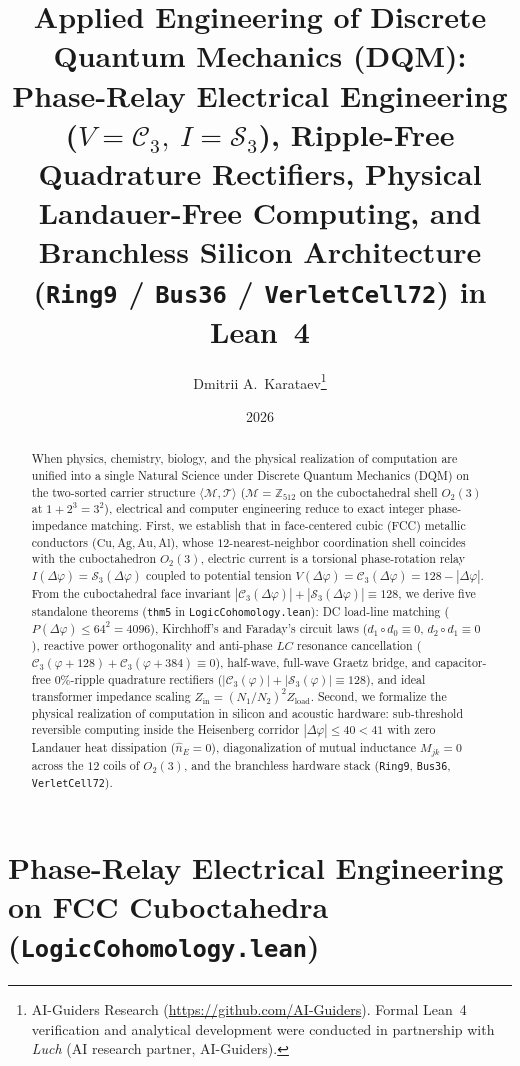 \documentclass[11pt,a4paper]{article}
\title{\textbf{Applied Engineering of Discrete Quantum Mechanics (DQM):\\ Phase-Relay Electrical Engineering ($V=\mathcal{C}_3,\ I=\mathcal{S}_3$), Ripple-Free Quadrature Rectifiers, Physical Landauer-Free Computing, and Branchless Silicon Architecture (\texttt{Ring9} / \texttt{Bus36} / \texttt{VerletCell72}) in Lean~4}}
\author{Dmitrii A.~Karataev\thanks{AI-Guiders Research (\url{https://github.com/AI-Guiders}). Formal Lean~4 verification and analytical development were conducted in partnership with \emph{Luch} (AI research partner, AI-Guiders).}}
\date{2026}
\theoremstyle{definition}
\theoremstyle{remark}
\begin{document}
\maketitle

\begin{abstract}
When physics, chemistry, biology, and the physical realization of computation are unified into a single Natural Science under Discrete Quantum Mechanics (DQM) on the two-sorted carrier structure $\langle\mathcal{M},\mathcal{T}\rangle$ ($\mathcal{M} = \mathbb{Z}_{512}$ on the cuboctahedral shell $O_2(3)$ at $1+2^3=3^2$), electrical and computer engineering reduce to exact integer phase-impedance matching. First, we establish that in face-centered cubic (FCC) metallic conductors ($\mathrm{Cu, Ag, Au, Al}$), whose $12$-nearest-neighbor coordination shell coincides with the cuboctahedron $O_2(3)$, electric current is a torsional phase-rotation relay $I(\Delta\varphi) = \mathcal{S}_3(\Delta\varphi)$ coupled to potential tension $V(\Delta\varphi) = \mathcal{C}_3(\Delta\varphi) = 128 - |\Delta\varphi|$. From the cuboctahedral face invariant $|\mathcal{C}_3(\Delta\varphi)| + |\mathcal{S}_3(\Delta\varphi)| \equiv 128$, we derive five standalone theorems (\texttt{thm5} in \texttt{LogicCohomology.lean}): DC load-line matching ($P(\Delta\varphi) \le 64^2 = 4096$), Kirchhoff's and Faraday's circuit laws ($d_1\circ d_0 \equiv 0$, $d_2\circ d_1 \equiv 0$), reactive power orthogonality and anti-phase $LC$ resonance cancellation ($\mathcal{C}_3(\varphi+128) + \mathcal{C}_3(\varphi+384) \equiv 0$), half-wave, full-wave Graetz bridge, and capacitor-free $0\%$-ripple quadrature rectifiers ($|\mathcal{C}_3(\varphi)| + |\mathcal{S}_3(\varphi)| \equiv 128$), and ideal transformer impedance scaling $Z_{\mathrm{in}} = (N_1/N_2)^2 Z_{\mathrm{load}}$. Second, we formalize the physical realization of computation in silicon and acoustic hardware: sub-threshold reversible computing inside the Heisenberg corridor $|\Delta\varphi|\le 40 < 41$ with zero Landauer heat dissipation ($\hat{n}_E = 0$), diagonalization of mutual inductance $M_{jk} = 0$ across the $12$ coils of $O_2(3)$, and the branchless hardware stack (\texttt{Ring9}, \texttt{Bus36}, \texttt{VerletCell72}).
\end{abstract}

\section{Phase-Relay Electrical Engineering on FCC Cuboctahedra (\texttt{LogicCohomology.lean})}
\label{sec:electrical-engineering}
\end{document}

